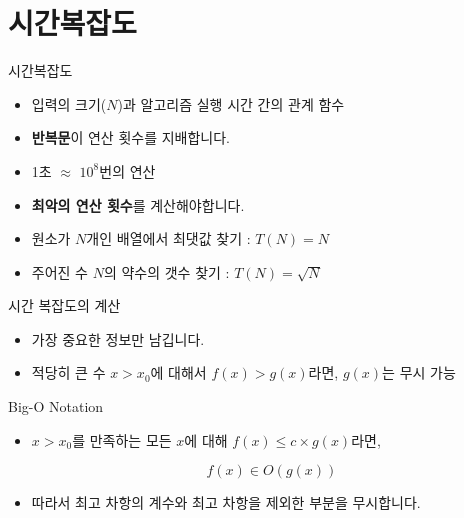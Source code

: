 \section{시간복잡도}

\begin{frame}{\textbf{\currentname}}
    \vspace{0.5cm}
    \begin{block}{시간복잡도}
        \begin{itemize}
            \item 입력의 크기($N$)과 알고리즘 실행 시간 간의 관계 함수
            \item \textbf{반복문}이 연산 횟수를 지배합니다.
            \item 1초 $\approx$ $10^{8}$번의 연산
            \item \textbf{최악의 연산 횟수}를 계산해야합니다.
        \end{itemize}
    \end{block}

    \begin{example}
        \begin{itemize}
            \item 원소가 $N$개인 배열에서 최댓값 찾기 : $T(N)=N$
            \item 주어진 수 $N$의 약수의 갯수 찾기 : $T(N)=\sqrt{N}$
        \end{itemize}
    \end{example}
\end{frame}

\begin{frame}{\textbf{\currentname}}
    \begin{block}{시간 복잡도의 계산}
        \begin{itemize}
            \item 가장 중요한 정보만 남깁니다.
            \item 적당히 큰 수 $x>x_{0}$에 대해서 $f(x)>g(x)$라면, $g(x)$는 무시 가능
        \end{itemize}
    \end{block}

    \begin{block}{Big-O Notation}
        \begin{itemize}
            \item $x>x_{0}$를 만족하는 모든 $x$에 대해 $f(x)\leq c\times g(x)$라면, 

            $$f(x)\in O\left(g(x)\right)$$

            \item 따라서 최고 차항의 계수와 최고 차항을 제외한 부분을 무시합니다.
        \end{itemize}
    \end{block}
\end{frame}

